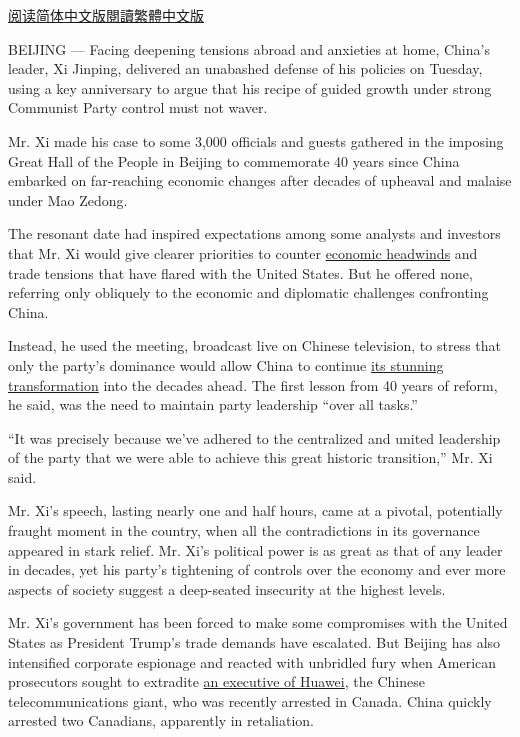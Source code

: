 \href{https://cn.nytimes3xbfgragh.onion/china/20181219/xi-jinping-speech-china/}{阅读简体中文版}\href{https://cn.nytimes3xbfgragh.onion/china/20181219/xi-jinping-speech-china/zh-hant/}{閱讀繁體中文版}

BEIJING --- Facing deepening tensions abroad and anxieties at home,
China's leader, Xi Jinping, delivered an unabashed defense of his
policies on Tuesday, using a key anniversary to argue that his recipe of
guided growth under strong Communist Party control must not waver.

Mr. Xi made his case to some 3,000 officials and guests gathered in the
imposing Great Hall of the People in Beijing to commemorate 40 years
since China embarked on far-reaching economic changes after decades of
upheaval and malaise under Mao Zedong.

The resonant date had inspired expectations among some analysts and
investors that Mr. Xi would give clearer priorities to counter
\href{https://www.nytimes3xbfgragh.onion/2018/12/14/business/china-economy-xi-jinping.html?action=click\&module=RelatedCoverage\&pgtype=Article\&region=Footer}{economic
headwinds} and trade tensions that have flared with the United States.
But he offered none, referring only obliquely to the economic and
diplomatic challenges confronting China.

Instead, he used the meeting, broadcast live on Chinese television, to
stress that only the party's dominance would allow China to continue
\href{https://www.nytimes3xbfgragh.onion/interactive/2018/11/25/world/asia/china-economy-strategy.html?action=click\&module=RelatedCoverage\&pgtype=Article\&region=Footer}{its
stunning transformation} into the decades ahead. The first lesson from
40 years of reform, he said, was the need to maintain party leadership
``over all tasks.''

``It was precisely because we've adhered to the centralized and united
leadership of the party that we were able to achieve this great historic
transition,'' Mr. Xi said.

Mr. Xi's speech, lasting nearly one and half hours, came at a pivotal,
potentially fraught moment in the country, when all the contradictions
in its governance appeared in stark relief. Mr. Xi's political power is
as great as that of any leader in decades, yet his party's tightening of
controls over the economy and ever more aspects of society suggest a
deep-seated insecurity at the highest levels.

Mr. Xi's government has been forced to make some compromises with the
United States as President Trump's trade demands have escalated. But
Beijing has also intensified corporate espionage and reacted with
unbridled fury when American prosecutors sought to extradite
\href{https://www.nytimes3xbfgragh.onion/2018/12/14/business/huawei-meng-hsbc-canada.html?module=inline}{an
executive of Huawei}, the Chinese telecommunications giant, who was
recently arrested in Canada. China quickly arrested two Canadians,
apparently in retaliation.

